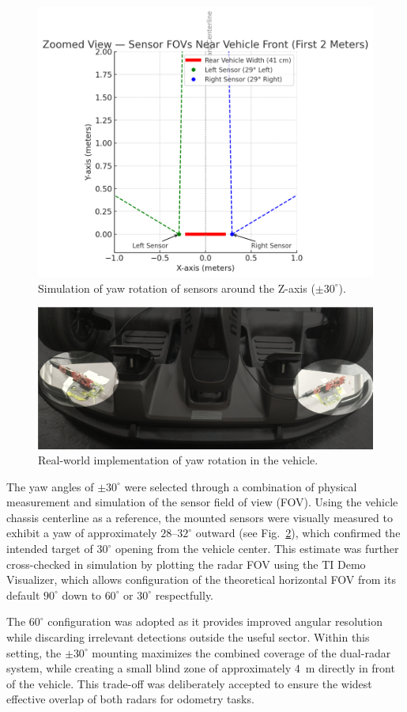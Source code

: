 \begin{figure}[!htbp]
    \centering
    \includegraphics[width=0.8\linewidth]{images/SensorsRotation.png}
    \caption{Simulation of yaw rotation of sensors around the Z-axis ($\pm30^\circ$).}
    \label{fig:z_axis_rotation}
\end{figure}

\begin{figure}[!htbp]
    \centering
    \includegraphics[width=0.8\linewidth]{images/vehicleRadarYawRotationHighlited.png}
    \caption{Real-world implementation of yaw rotation in the vehicle.}
    \label{fig:vehicleRadarYawRotation}
\end{figure}

\newpage
The yaw angles of $\pm30^\circ$ were selected through a combination of physical measurement and simulation of the sensor field of view (FOV).  
Using the vehicle chassis centerline as a reference, the mounted sensors were visually measured to exhibit a yaw of approximately $28$--$32^\circ$ outward (see Fig.~\ref{fig:vehicleRadarYawRotation}), which confirmed the intended target of $30^\circ$ opening from the vehicle center.  
This estimate was further cross-checked in simulation by plotting the radar FOV using the TI Demo Visualizer, which allows configuration of the theoretical horizontal FOV from its default $90^\circ$ down to $60^\circ$ or $30^\circ$ respectfully.  

The $60^\circ$ configuration was adopted as it provides improved angular resolution while discarding irrelevant detections outside the useful sector.  
Within this setting, the $\pm30^\circ$ mounting maximizes the combined coverage of the dual-radar system, while creating a small blind zone of approximately $4$~m directly in front of the vehicle.  
This trade-off was deliberately accepted to ensure the widest effective overlap of both radars for odometry tasks.

